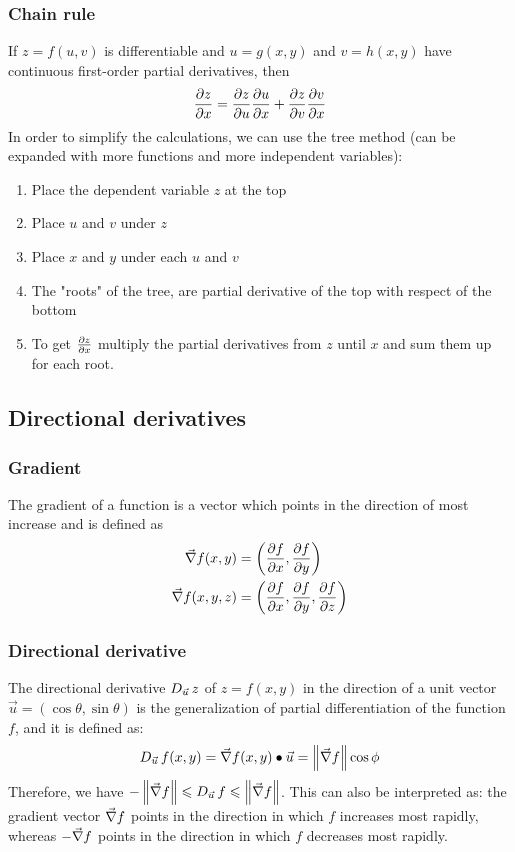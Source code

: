 \documentclass[10pt, twocolumn]{article}
\theoremstyle{remark}
\begin{document}
\subsubsection*{Chain rule}
If \(z = f(u, v)\) is differentiable and \(u = g(x, y)\) and \(v = h(x, y)\) have continuous first-order partial derivatives, then
\[
  \frac{\partial z}{\partial x} = \frac{\partial z}{\partial u}\frac{\partial u}{\partial x} + \frac{\partial z}{\partial v}\frac{\partial v}{\partial x}
\]
In order to simplify the calculations, we can use the tree method (can be expanded with more functions and more independent variables):
\begin{enumerate}
  \item Place the dependent variable \(z\) at the top
  \item Place \(u\) and \(v\) under \(z\)
  \item Place \(x\) and \(y\) under each \(u\) and \(v\)
  \item The "roots" of the tree, are partial derivative of the top with respect of the bottom
  \item To get \(\frac{\partial z}{\partial x}\) multiply the partial derivatives from \(z\) until \(x\) and sum them up for each root.
\end{enumerate}

\subsection{Directional derivatives}
\subsubsection*{Gradient}
The gradient of a function is a vector which points in the direction of most increase and is defined as
\begin{align*}
  \vec{\nabla}f(x, y)    & = \left( \frac{\partial f}{\partial x}, \frac{\partial f}{\partial y} \right)                           \\
  \vec{\nabla}f(x, y, z) & = \left( \frac{\partial f}{\partial x}, \frac{\partial f}{\partial y}, \frac{\partial f}{\partial z} \right)
\end{align*}


\subsubsection*{Directional derivative}
The directional derivative \(D_{\vec{u}}\,z\) of \(z = f(x, y)\) in the direction of a unit vector \(\vec{u} = (\cos\theta, \sin\theta)\) is the generalization of partial differentiation of the function \(f\), and it is defined as:
\[
  D_{\vec{u}}\,f(x, y) = \vec{\nabla}f(x, y) \bullet \vec{u} = \left\| \vec{\nabla}f \right\|\cos\phi
\]
Therefore, we have \(-\left\| \vec{\nabla}f \right\| \leqslant D_{\vec{u}}\,f \leqslant \left\| \vec{\nabla}f \right\|\).
This can also be interpreted as: the gradient vector \(\vec{\nabla}f\) points in the direction in which \(f\) increases most rapidly, whereas \(-\vec{\nabla}f\) points in the direction in which \(f\) decreases most rapidly.
\end{document}

